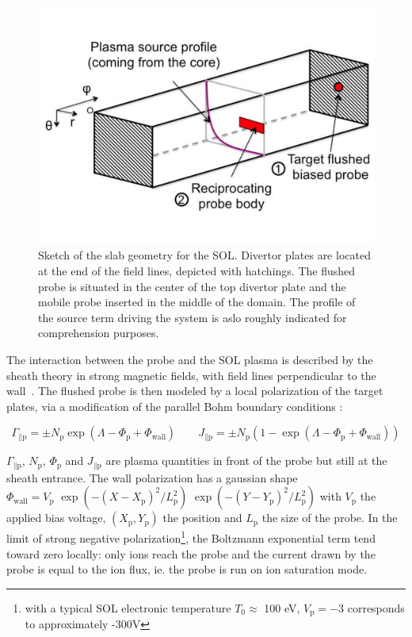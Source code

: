 \documentclass[cpp,a4paper,fleqn,twoside%
]{w-art}
\begin{document}
 \begin{figure}
  \begin{minipage}[c]{0.50\textwidth}
    \includegraphics[width=\textwidth]{figures/geometry.pdf}
  \end{minipage}\hfill
  \begin{minipage}[c]{0.45\textwidth}
    \caption{Sketch of the slab geometry for the SOL. Divertor plates are 
 located at the end of the field lines, depicted with hatchings. The flushed
 probe is situated in the center of the top divertor plate and the mobile
 probe inserted in the middle of the domain. The
 profile of the source term driving the system is aslo roughly indicated for
 comprehension purposes.} \label{fig:1}
  \end{minipage}
\end{figure}

 The interaction between the probe
and the SOL plasma is described by the sheath theory in strong magnetic
fields, with field lines perpendicular to the wall~\cite{Bohm49}.
The flushed probe is then modeled by a local polarization of the target plates,
via a modification of the parallel Bohm boundary conditions :
 
 $$\Gamma_{\parallel\text{p}}=\pm
N_\text{p}\exp(\Lambda-\Phi_\text{p}+\Phi_\text{wall})
 \qquad
 J_{\parallel\text{p}} = \pm
 N_\text{p}(1-\exp(\Lambda-\Phi_\text{p}+\Phi_\text{wall}))
$$ 

$\Gamma_{\parallel\text{p}}$, $N_\text{p}$,
$\Phi_\text{p}$ and $J_{\parallel\text{p}}$ are plasma quantities in front of the
probe but still at the sheath entrance. The wall polarization
has a gaussian shape
$\Phi_\text{wall}=V_\text{p}\text{~}\exp(-(X-X_\text{p})^2/L_\text{p}^2)\text{~}\exp(-(Y-Y_\text{p})^2/L_\text{p}^2)$
with $V_\text{p}$ the applied bias voltage, $(X_\text{p}, Y_\text{p})$ the position and $L_\text{p}$ the
size of the probe. In the limit of strong negative polarization\footnote{with a
typical SOL electronic temperature $T_0\approx$ 100 eV, $V_\text{p}=-3$ corresponds to
approximately -300V}, the Boltzmann exponential term tend toward zero locally:
only ions reach the probe and the current drawn by the probe is
equal to the ion flux, ie. the probe is run on ion saturation mode.
\end{document}

